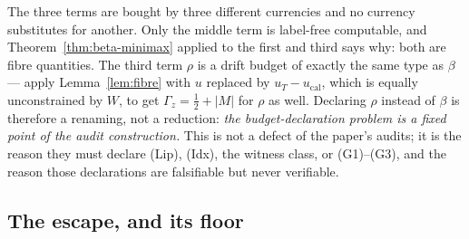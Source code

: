 \begin{remark}\label{rem:reading}
The three terms are bought by three different currencies and no currency substitutes for
another. Only the middle term is label-free computable, and
Theorem~\ref{thm:beta-minimax} applied to the first and third says why: both are fibre
quantities. The third term $\rho$ is a drift budget of exactly the same type as $\beta$ ---
apply Lemma~\ref{lem:fibre} with $u$ replaced by $u_T-u_{\mathrm{cal}}$, which is equally
unconstrained by $W$, to get $\Gamma_z=\tfrac12+|M|$ for $\rho$ as well. Declaring $\rho$
instead of $\beta$ is therefore a renaming, not a reduction: \emph{the budget-declaration
problem is a fixed point of the audit construction.} This is not a defect of the paper's
audits; it is the reason they must declare (Lip), (Idx), the witness class, or (G1)--(G3),
and the reason those declarations are falsifiable but never verifiable.
\end{remark}

\subsection{The escape, and its floor}

